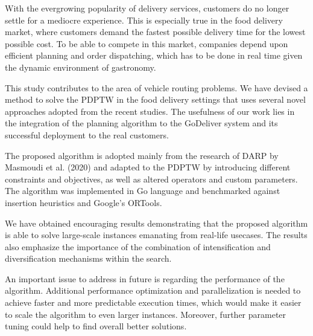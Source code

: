 With the evergrowing popularity of delivery services, customers do no longer settle for a mediocre experience. This is especially true in the food delivery market, where customers demand the fastest possible delivery time for the lowest possible cost. To be able to compete in this market, companies depend upon efficient planning and order dispatching, which has to be done in real time given the dynamic environment of gastronomy.

This study contributes to the area of vehicle routing problems. We have devised a method to solve the PDPTW in the food delivery settings that uses several novel approaches adopted from the recent studies. The usefulness of our work lies in the integration of the planning algorithm to the GoDeliver system and its successful deployment to the real customers.

The proposed algorithm is adopted mainly from the research of DARP by Masmoudi et al. (2020) \cite{Masmoudi2020} and adapted to the PDPTW by introducing different constraints and objectives, as well as altered operators and custom parameters. The algorithm was implemented in Go language and benchmarked against insertion heuristics and Google's ORTools.

We have obtained encouraging results demonstrating that the proposed algorithm is able to solve large-scale instances emanating from real-life usecases. The results also emphasize the importance of the combination of intensification and diversification mechanisms within the search.

An important issue to address in future is regarding the performance of the algorithm. Additional performance optimization and parallelization is needed to achieve faster and more predictable execution times, which would make it easier to scale the algorithm to even larger instances. Moreover, further parameter tuning could help to find overall better solutions.
